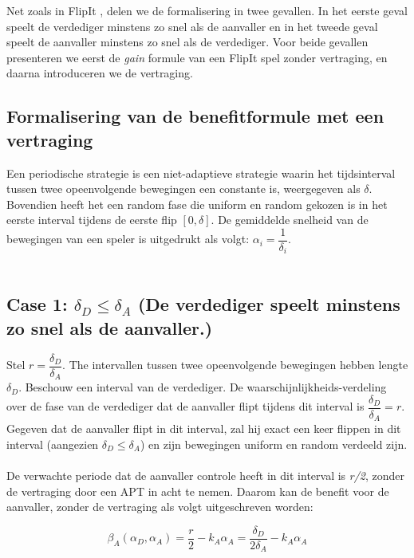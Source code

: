 \documentclass[master=cws, masteroption=vs,english]{kulemt}
\begin{document}
\begin{abstract*}
Net zoals in FlipIt \citep{FlipIt}, delen we de formalisering in twee gevallen. In het eerste geval speelt de verdediger minstens zo snel als de aanvaller en in het tweede geval speelt de aanvaller minstens zo snel als de verdediger. Voor beide gevallen presenteren we eerst de \textit{gain} formule van een FlipIt spel zonder vertraging, en daarna introduceren we de vertraging. \\

\subsection{ Formalisering van de benefitformule met een vertraging}
Een periodische strategie is een niet-adaptieve strategie waarin het tijdsinterval tussen twee opeenvolgende bewegingen een constante is, weergegeven als $\delta$. Bovendien heeft het een random fase die uniform en random gekozen is in het eerste interval tijdens de eerste flip $[0,\delta]$. De gemiddelde snelheid van de bewegingen van een speler is uitgedrukt als volgt: $\alpha_{i} = \dfrac{1}{\delta_{i}}$. \\
~~\\

\subsection*{\textbf{Case 1:} $\delta_{D} \leq \delta_{A} $ (De verdediger speelt minstens zo snel als de aanvaller.) }

Stel $r = \dfrac{\delta_{D}}{ \delta_{A} }$. The intervallen tussen twee opeenvolgende bewegingen hebben lengte $\delta_{D}$. Beschouw een interval van de verdediger. De waarschijnlijkheids-verdeling over de fase van de verdediger dat de aanvaller flipt tijdens dit interval is $\dfrac{\delta_{D}}{ \delta_{A} } = r$. Gegeven dat de aanvaller flipt in dit interval, zal hij exact een keer flippen in dit interval (aangezien $\delta_{D} \leq \delta_{A} $) en zijn bewegingen uniform en random verdeeld zijn. \\ \\

De verwachte periode dat de aanvaller controle heeft in dit interval is \textit{r/2}, zonder de vertraging door een APT in acht te nemen. Daarom kan de benefit voor de aanvaller, zonder de vertraging als volgt uitgeschreven worden:

\begin{equation}\label{first}
\beta_{A}(\alpha_{D},\alpha_{A}) =\dfrac {r} {2} - k_{A} \alpha_{A} = \dfrac {\delta_{D}} {2\delta_{A}} - k_{A} \alpha_{A}  
\end{equation}\\


\end{abstract*}
\end{document}
